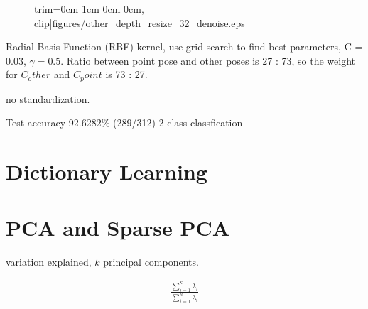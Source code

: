 \begin{figure}
{  trim={0cm 1cm 0cm 0cm}, clip]{figures/other_depth_resize_32_denoise.eps} }
\end{figure}

Radial Basis Function (RBF) kernel, use grid search to find best parameters, C =
0.03, $\gamma = 0.5$. Ratio between point pose and other poses is 27 : 73, so
the weight for $C_other$ and $C_point$ is 73 : 27. 

no standardization.

Test accuracy 92.6282\% (289/312) 2-class classfication


\section{Dictionary Learning}

\section{PCA and Sparse PCA}
variation explained, $k$ principal components.

\begin{align}
\frac{\sum_{i=1}^{k} \lambda_i}{\sum_{i=1}^{n}\lambda_i}
\end{align}